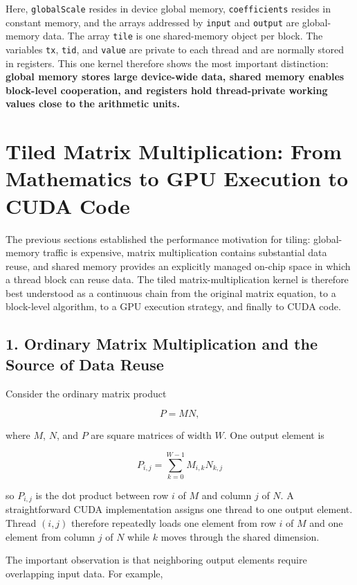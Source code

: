 \documentclass[11pt,a4paper]{article}
\begin{document}
Here, \texttt{globalScale} resides in device global memory, \texttt{coefficients} resides in constant memory, and the arrays addressed by \texttt{input} and \texttt{output} are global-memory data. The array \texttt{tile} is one shared-memory object per block. The variables \texttt{tx}, \texttt{tid}, and \texttt{value} are private to each thread and are normally stored in registers. This one kernel therefore shows the most important distinction: \textbf{global memory stores large device-wide data, shared memory enables block-level cooperation, and registers hold thread-private working values close to the arithmetic units.}

\section{Tiled Matrix Multiplication: From Mathematics to GPU Execution to CUDA Code}

The previous sections established the performance motivation for tiling: global-memory traffic is expensive, matrix multiplication contains substantial data reuse, and shared memory provides an explicitly managed on-chip space in which a thread block can reuse data. The tiled matrix-multiplication kernel is therefore best understood as a continuous chain from the original matrix equation, to a block-level algorithm, to a GPU execution strategy, and finally to CUDA code.

\subsection{1. Ordinary Matrix Multiplication and the Source of Data Reuse}

Consider the ordinary matrix product

\[
    P = MN,
\]

where $M$, $N$, and $P$ are square matrices of width $W$. One output element is

\[
\boxed{
    P_{i,j}
    =
    \sum_{k=0}^{W-1}
    M_{i,k}N_{k,j}
}
\]

so $P_{i,j}$ is the dot product between row $i$ of $M$ and column $j$ of $N$. A straightforward CUDA implementation assigns one thread to one output element. Thread $(i,j)$ therefore repeatedly loads one element from row $i$ of $M$ and one element from column $j$ of $N$ while $k$ moves through the shared dimension.

The important observation is that neighboring output elements require overlapping input data. For example,
\end{document}

